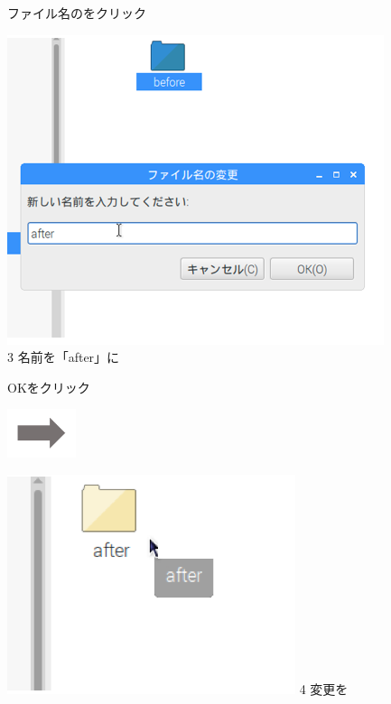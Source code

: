\begin{figure}[ht]
\begin{minipage}{0.4\textwidth}
    ファイル名のをクリック
  \end{minipage}

  \begin{minipage}{0.4\textwidth}
    \includegraphics[width=\linewidth]{text01-img/textbook-img055.png}
    3 名前を「after」に

    OKをクリック
  \end{minipage}
  \includegraphics[width=2cm]{text01-img/textbook-img053.png}
  \begin{minipage}{0.4\textwidth}
    \includegraphics[width=\linewidth]{text01-img/textbook-img056.png}
    4 変更を
  \end{minipage}
  \centering


\end{figure}
